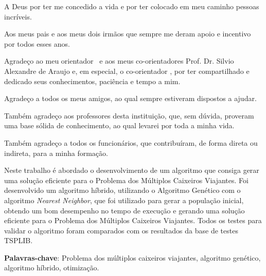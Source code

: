 \documentclass[12pt,openright,a4paper,twoside]{tcc}
\begin{document}

	\imprimircapa
	\imprimirfolhaderosto
	\folhadeaprovacaoteste
    
    \begin{agradecimentos}
        A Deus por ter me concedido a vida e por ter colocado em meu caminho pessoas incríveis.

        Aos meus pais e aos meus dois irmãos que sempre me deram apoio e incentivo por todos esses anos.

        Agradeço ao meu orientador \imprimirorientador~e aos meus co-orientadores Prof. Dr. Silvio Alexandre de Araujo e, em especial, o co-orientador \imprimircoorientador, por ter compartilhado  e dedicado seus conhecimentos, paciência e tempo a mim.

        Agradeço a todos os meus amigos, ao qual sempre estiveram dispostos a ajudar.

        Também agradeço aos professores desta instituição, que, sem dúvida, proveram uma base sólida de conhecimento, ao qual levarei por toda a minha vida.

        Também agradeço a todos os funcionários, que contribuíram, de forma direta ou indireta, para a minha formação.

    \end{agradecimentos}
    
    \listoffigures*
    \cleardoublepage
	\tableofcontents
   
	\newpage

	\begin{resumo}
        Neste trabalho é abordado o desenvolvimento de um algoritmo que consiga gerar uma solução eficiente para o Problema dos Múltiplos Caixeiros Viajantes.
        Foi desenvolvido um algoritmo híbrido, utilizando o Algoritmo Genético com o algoritmo \textit{Nearest Neighbor}, que foi utilizado para gerar a população inicial, obtendo um bom desempenho no tempo de execução e gerando uma solução eficiente para o Problema dos Múltiplos Caixeiros Viajantes. Todos os testes para validar o algoritmo foram comparados com os resultados da base de testes TSPLIB. 
        
        \vspace{\onelineskip}
        \noindent
        \textbf{Palavras-chave}: Problema dos múltiplos caixeiros viajantes, algoritmo genético,  algoritmo híbrido, otimização.

	\end{resumo}
\end{document}
